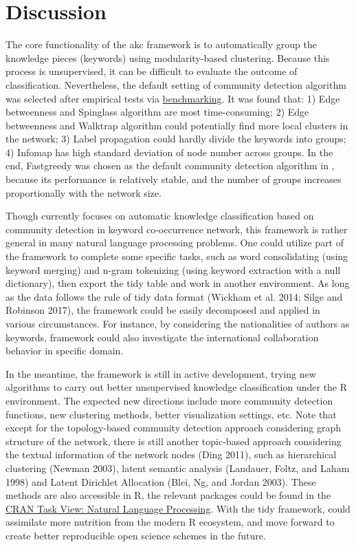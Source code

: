 \hypertarget{discussion}{%
\section{Discussion}\label{discussion}}

The core functionality of the akc framework is to automatically group the knowledge pieces (keywords) using modularity-based clustering. Because this process is unsupervised, it can be difficult to evaluate the outcome of classification. Nevertheless, the default setting of community detection algorithm was selected after empirical tests via \href{https://cran.r-project.org/web/packages/akc/vignettes/Benchmarking.html}{benchmarking}. It was found that: 1) Edge betweenness and Spinglass algorithm are most time-consuming; 2) Edge betweenness and Walktrap algorithm could potentially find more local clusters in the network; 3) Label propagation could hardly divide the keywords into groups; 4) Infomap has high standard deviation of node number across groups. In the end, Fastgreedy was chosen as the default community detection algorithm in , because its performance is relatively stable, and the number of groups increases proportionally with the network size.

Though  currently focuses on automatic knowledge classification based on community detection in keyword co-occurrence network, this framework is rather general in many natural language processing problems. One could utilize part of the framework to complete some specific tasks, such as word consolidating (using keyword merging) and n-gram tokenizing (using keyword extraction with a null dictionary), then export the tidy table and work in another environment. As long as the data follows the rule of tidy data format (Wickham et al. 2014; Silge and Robinson 2017), the  framework could be easily decomposed and applied in various circumstances. For instance, by considering the nationalities of authors as keywords,  framework could also investigate the international collaboration behavior in specific domain.

In the meantime, the  framework is still in active development, trying new algorithms to carry out better unsupervised knowledge classification under the R environment. The expected new directions include more community detection functions, new clustering methods, better visualization settings, etc. Note that except for the topology-based community detection approach considering graph structure of the network, there is still another topic-based approach considering the textual information of the network nodes (Ding 2011), such as hierarchical clustering (Newman 2003), latent semantic analysis (Landauer, Foltz, and Laham 1998) and Latent Dirichlet Allocation (Blei, Ng, and Jordan 2003). These methods are also accessible in R, the relevant packages could be found in the \href{https://cran.r-project.org/web/views/NaturalLanguageProcessing.html}{CRAN Task View: Natural Language Processing}. With the tidy framework,  could assimilate more nutrition from the modern R ecosystem, and move forward to create better reproducible open science schemes in the future.

